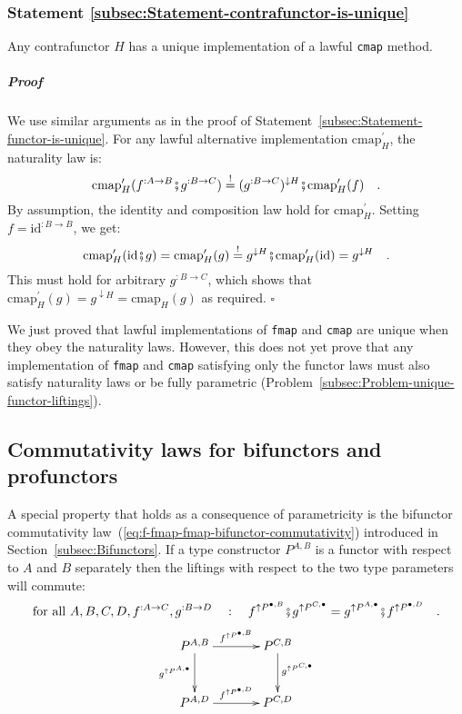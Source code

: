 \subsubsection{Statement \label{subsec:Statement-contrafunctor-is-unique}\ref{subsec:Statement-contrafunctor-is-unique}}

Any contrafunctor $H$ has a unique implementation of a lawful \lstinline!cmap!
method. 

\subparagraph{Proof}

We use similar arguments as in the proof of Statement~\ref{subsec:Statement-functor-is-unique}.
For any lawful alternative implementation $\text{cmap}_{H}^{\prime}$,
the naturality law is:
\[
\text{cmap}_{H}^{\prime}(f^{:A\rightarrow B}\bef g^{:B\rightarrow C})\overset{!}{=}(g^{:B\rightarrow C})^{\downarrow H}\bef\text{cmap}_{H}^{\prime}(f)\quad.
\]
By assumption, the identity and composition law hold for $\text{cmap}_{H}^{\prime}$.
Setting $f=\text{id}^{:B\rightarrow B}$, we get:
\[
\text{cmap}_{H}^{\prime}(\text{id}\bef g)=\text{cmap}_{H}^{\prime}(g)\overset{!}{=}g^{\downarrow H}\bef\text{cmap}_{H}^{\prime}(\text{id})=g^{\downarrow H}\quad.
\]
This must hold for arbitrary $g^{:B\rightarrow C}$, which shows that
$\text{cmap}_{H}^{\prime}(g)=g^{\downarrow H}=\text{cmap}_{H}(g)$
as required. $\square$

We just proved that lawful implementations of \lstinline!fmap! and
\lstinline!cmap! are unique when they obey the naturality laws. However,
this does not yet prove that any implementation of \lstinline!fmap!
and \lstinline!cmap! satisfying only the functor laws must also satisfy
naturality laws or be fully parametric (Problem~\ref{subsec:Problem-unique-functor-liftings}).

\subsection{Commutativity laws for bifunctors and profunctors\label{sec:Commutativity-laws-for-type-constructors}}

A special property that holds as a consequence of parametricity is
the bifunctor commutativity law~(\ref{eq:f-fmap-fmap-bifunctor-commutativity})
introduced in Section~\ref{subsec:Bifunctors}. If a type constructor
$P^{A,B}$ is a functor with respect to $A$ and $B$ separately then
the liftings with respect to the two type parameters will commute:
\[
\text{for all }A,B,C,D,f^{:A\rightarrow C},g^{:B\rightarrow D}\quad:\quad f^{\uparrow P^{\bullet,B}}\bef g^{\uparrow P^{C,\bullet}}=g^{\uparrow P^{A,\bullet}}\bef f^{\uparrow P^{\bullet,D}}\quad.
\]
\[
\xymatrix{\xyScaleY{2.5pc}\xyScaleX{3.0pc}P^{A,B}\ar[r]\sp(0.5){f^{\uparrow P^{\bullet,B}}}\ar[d]\sb(0.45){g^{\uparrow P^{A,\bullet}}} & P^{C,B}\ar[d]\sp(0.4){g^{\uparrow P^{C,\bullet}}}\\
P^{A,D}\ar[r]\sp(0.5){f^{\uparrow P^{\bullet,D}}} & P^{C,D}
}
\]

